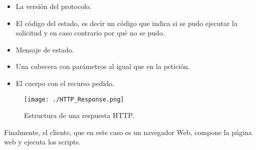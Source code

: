 \begin{itemize}
	\item La versión del protocolo.
	\item El código del estado, es decir un código que indica si se pudo ejecutar la solicitud y en caso contrario por qué no se pudo.
	\item Mensaje de estado.
	\item Una cabecera con parámetros al igual que en la petición.
	\item El cuerpo con el recurso pedido.
\end{itemize}

\begin{figure}[H]
	\centering
	\texttt{[image: ./HTTP\_Response.png]}
	\caption{Estructura de una respuesta HTTP\protect\footnotemark.}
	\label{fig:HTTP_Resp}
\end{figure}

Finalmente, el cliente, que en este caso es un navegador Web, compone la página web y ejecuta los scripts.

